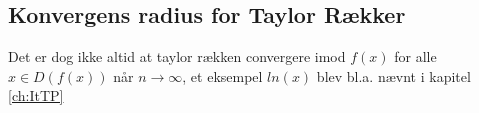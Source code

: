 \subsection*{Konvergens radius for Taylor Rækker} %
Det er dog ikke altid at taylor rækken convergere imod $f(x)$ for alle $x \in D(f(x))$ når $n \rightarrow \infty$,
et eksempel $ln(x)$ blev bl.a. nævnt i kapitel \ref{ch:ItTP} 



